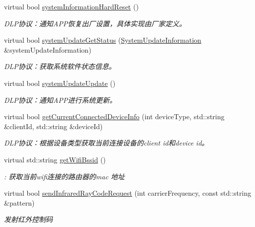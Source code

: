 \begin{DoxyCompactItemize}
virtual bool \hyperlink{classduerOSDcsSDK_1_1sdkInterfaces_1_1ApplicationImplementation_a8ce2c9ad1c35f8c75a0dad0731b8850e}{system\+Information\+Hard\+Reset} ()
\begin{DoxyCompactList}\small\item\em D\+L\+P协议：通知\+A\+P\+P恢复出厂设置，具体实现由厂家定义。 \end{DoxyCompactList}\item 
virtual bool \hyperlink{classduerOSDcsSDK_1_1sdkInterfaces_1_1ApplicationImplementation_aa1f6aab8cf3806120bce89da4f9447d6}{system\+Update\+Get\+Status} (\hyperlink{structduerOSDcsSDK_1_1sdkInterfaces_1_1SystemUpdateInformation}{System\+Update\+Information} \&system\+Update\+Information)
\begin{DoxyCompactList}\small\item\em D\+L\+P协议：获取系统软件状态信息。 \end{DoxyCompactList}\item 
virtual bool \hyperlink{classduerOSDcsSDK_1_1sdkInterfaces_1_1ApplicationImplementation_a644e2bfddb8d4a38fadc0acde7d568ac}{system\+Update\+Update} ()
\begin{DoxyCompactList}\small\item\em D\+L\+P协议：通知\+A\+P\+P进行系统更新。 \end{DoxyCompactList}\item 
virtual bool \hyperlink{classduerOSDcsSDK_1_1sdkInterfaces_1_1ApplicationImplementation_a8d12823ee272295a67796f6d39dcddae}{get\+Current\+Connected\+Device\+Info} (int device\+Type, std\+::string \&client\+Id, std\+::string \&device\+Id)
\begin{DoxyCompactList}\small\item\em D\+L\+P协议：根据设备类型获取当前连接设备的client id和device id。 \end{DoxyCompactList}\item 
virtual std\+::string \hyperlink{classduerOSDcsSDK_1_1sdkInterfaces_1_1ApplicationImplementation_a2f38ee5cb10328c1dde10c8940dd4e8c}{get\+Wifi\+Bssid} ()
\begin{DoxyCompactList}\small\item\em \+: 获取当前wifi连接的路由器的mac 地址 \end{DoxyCompactList}\item 
virtual bool \hyperlink{classduerOSDcsSDK_1_1sdkInterfaces_1_1ApplicationImplementation_a852302b46fca3524968580092a9ff5e3}{send\+Infrared\+Ray\+Code\+Request} (int carrier\+Frequency, const std\+::string \&pattern)
\begin{DoxyCompactList}\small\item\em 发射红外控制码 \end{DoxyCompactList}\end{DoxyCompactItemize}


